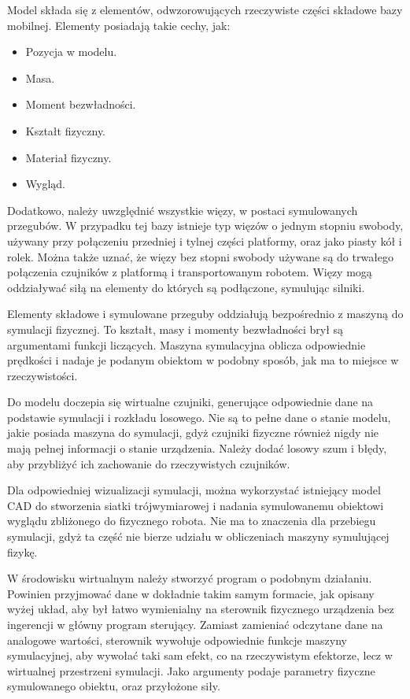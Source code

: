 	Model składa się z elementów, odwzorowujących rzeczywiste części składowe bazy mobilnej.
	Elementy posiadają takie cechy, jak:
	\begin{itemize}
		\item Pozycja w modelu.
		\item Masa.
		\item Moment bezwładności.
		\item Kształt fizyczny.
		\item Materiał fizyczny.
		\item Wygląd.
	\end{itemize}

	Dodatkowo, należy uwzględnić wszystkie więzy, w postaci symulowanych przegubów.
	W przypadku tej bazy istnieje typ więzów o jednym stopniu swobody, używany przy połączeniu przedniej i tylnej części platformy, oraz 
	jako piasty kół i rolek. Można także uznać, że więzy bez stopni swobody używane są do trwałego połączenia czujników z platformą i transportowanym robotem.
	Więzy mogą oddziaływać siłą na elementy do których są podłączone, symulując silniki.

	Elementy składowe i symulowane przeguby oddziałują bezpośrednio z maszyną do symulacji fizycznej. 
	To kształt, masy i momenty bezwładności brył są argumentami funkcji liczących.
	Maszyna symulacyjna oblicza odpowiednie prędkości i nadaje je podanym obiektom w podobny sposób, jak ma to miejsce w rzeczywistości.

	Do modelu doczepia się wirtualne czujniki, generujące odpowiednie dane na podstawie symulacji i rozkładu losowego.
	Nie są to pełne dane o stanie modelu, jakie posiada maszyna do symulacji, gdyż czujniki fizyczne również nigdy nie mają pełnej informacji o stanie urządzenia.
	Należy dodać losowy szum i błędy, aby przybliżyć ich zachowanie do rzeczywistych czujników.

	Dla odpowiedniej wizualizacji symulacji, można wykorzystać istniejący model CAD do stworzenia siatki trójwymiarowej i nadania symulowanemu obiektowi wyglądu zbliżonego do fizycznego robota. Nie ma to znaczenia dla przebiegu symulacji, gdyż ta część nie bierze udziału w obliczeniach maszyny symulującej fizykę.

	W środowisku wirtualnym należy stworzyć program o podobnym działaniu.
	Powinien przyjmować dane w dokładnie takim samym formacie, jak opisany wyżej układ, aby był łatwo wymienialny na sterownik fizycznego urządzenia bez ingerencji w główny program sterujący.
	Zamiast zamieniać odczytane dane na analogowe wartości, sterownik wywołuje odpowiednie funkcje maszyny symulacyjnej, aby wywołać taki sam efekt, co na rzeczywistym efektorze, lecz w wirtualnej przestrzeni symulacji.
	Jako argumenty podaje parametry fizyczne symulowanego obiektu, oraz przyłożone siły.

